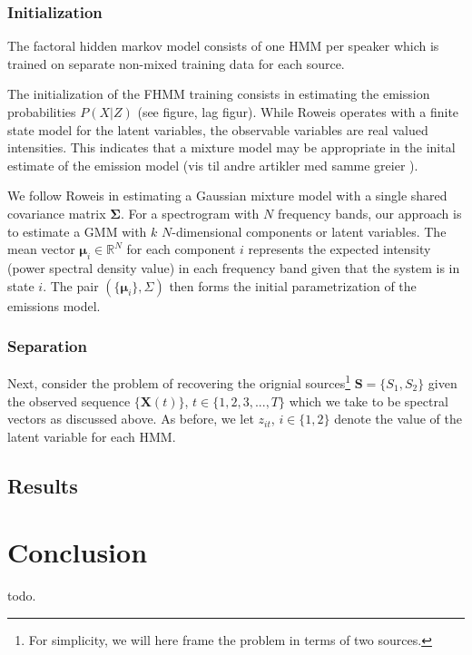 \documentclass[11pt, oneside, a4paper]{report}
\begin{document}
\subsection{Initialization}

The factoral hidden markov model consists of one HMM per speaker which
is trained on separate non-mixed training data for each source. 

The initialization of the FHMM training consists in estimating the
emission probabilities $P(X|Z)$ (see figure, lag figur). While Roweis
operates with a finite state model for the latent variables, the
observable variables are real valued intensities. This indicates that
a mixture model may be appropriate in the inital estimate of the
emission model (vis til andre artikler med samme greier ). 

We follow Roweis in estimating a Gaussian mixture model with a single
shared covariance matrix $\mathbf{\Sigma}$. For a spectrogram with $N$ frequency bands,
our approach is to estimate a GMM with $k$ $N$-dimensional components
or latent variables. The mean vector $\mathbf{\mu}_i\in\mathbb{R}^N$ for
each component $i$ represents the expected intensity (power spectral
density value) in each frequency band given that the system is in
state $i$. The pair $(\{\mathbf{\mu}_i\}, \Sigma)$ then forms the initial
parametrization of the emissions model.


\subsection{Separation}

Next, consider the problem of recovering the orignial
sources\footnote{For simplicity, we will here frame the problem in
  terms of two sources.} $\mathbf{S} =
\{S_1, S_2\}$ given the observed sequence $\{\mathbf{X}(t)\}$, $t \in \{1,2,3,...,T\}$ which we
take to be spectral vectors as discussed above. As before, we let
$z_{it}$, $i \in \{1,2\}$ denote the value of the latent variable for
each HMM. 


\section{Results}



\chapter{Conclusion}

todo.
\end{document}

